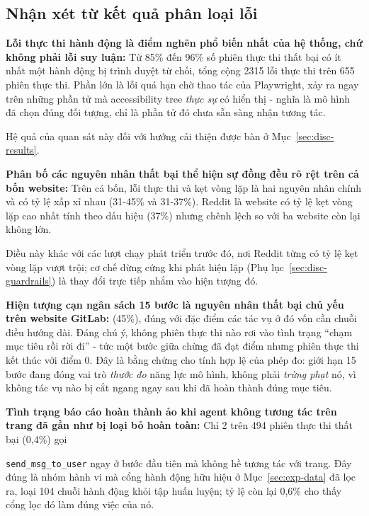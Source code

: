 \subsection{Nhận xét từ kết quả phân loại lỗi}
\textbf{Lỗi thực thi hành động là điểm nghẽn phổ biến nhất của hệ thống, chứ không phải lỗi suy luận:} Từ 85\% đến 96\% số phiên thực thi thất bại có ít nhất một hành động bị trình duyệt từ chối, tổng cộng 2315 lỗi thực thi trên 655 phiên thực thi. Phần lớn là lỗi quá hạn chờ thao tác của Playwright, xảy ra ngay trên những phần tử mà accessibility tree \emph{thực sự} có hiển thị - nghĩa là mô hình đã chọn đúng đối tượng, chỉ là phần tử đó chưa sẵn sàng nhận tương tác.

Hệ quả của quan sát này đối với hướng cải thiện được bàn ở Mục~\ref{sec:disc-results}.

\textbf{Phân bố các nguyên nhân thất bại thể hiện sự đồng đều rõ rệt trên cả bốn website:} Trên cả bốn, lỗi thực thi và kẹt vòng lặp là hai nguyên nhân chính và có tỷ lệ xấp xỉ nhau (31-45\% và 31-37\%). Reddit là website có tỷ lệ kẹt vòng lặp cao nhất tính theo dấu hiệu (37\%) nhưng chênh lệch so với ba website còn lại không lớn.

Điều này khác với các lượt chạy phát triển trước đó, nơi Reddit từng có tỷ lệ kẹt vòng lặp vượt trội; cơ chế dừng cứng khi phát hiện lặp (Phụ lục~\ref{sec:disc-guardrails}) là thay đổi trực tiếp nhắm vào hiện tượng đó.

\textbf{Hiện tượng cạn ngân sách 15 bước là nguyên nhân thất bại chủ yếu trên website GitLab:} (45\%), đúng với đặc điểm các tác vụ ở đó vốn cần chuỗi điều hướng dài. Đáng chú ý, không phiên thực thi nào rơi vào tình trạng ``chạm mục tiêu rồi rời đi'' - tức một bước giữa chừng đã đạt điểm nhưng phiên thực thi kết thúc với điểm 0. Đây là bằng chứng cho tính hợp lệ của phép đo: giới hạn 15 bước đang đóng vai trò \emph{thước đo} năng lực mô hình, không phải \emph{trừng phạt} nó, vì không tác vụ nào bị cắt ngang ngay sau khi đã hoàn thành đúng mục tiêu.

\textbf{Tình trạng báo cáo hoàn thành ảo khi agent không tương tác trên trang đã gần như bị loại bỏ hoàn toàn:} Chỉ 2 trên 494 phiên thực thi thất bại (0{,}4\%) gọi

\texttt{send\_msg\_to\_user} ngay ở bước đầu tiên mà không hề tương tác với trang. Đây đúng là nhóm hành vi mà cổng hành động hữu hiệu ở Mục~\ref{sec:exp-data} đã lọc ra, loại 104 chuỗi hành động khỏi tập huấn luyện; tỷ lệ còn lại 0{,}6\% cho thấy cổng lọc đó làm đúng việc của nó.

